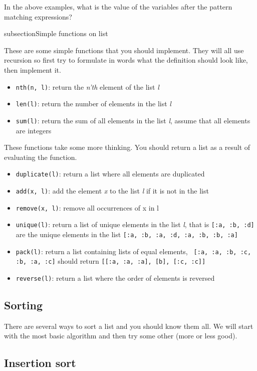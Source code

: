 \documentclass[a4paper,11pt]{article}
\begin{document}
In the above examples, what is the value of the variables after the
pattern matching expressions?

subsection{Simple functions on list}

These are some simple functions that you should implement. They will
all use recursion so first try to formulate in words what the
definition should look like, then implement it.

\begin{itemize}
\item {\tt nth(n, l)}: return the {\em n'th} element of the list {\em l}
\item {\tt len(l)}: return the number of elements in the list  {\em l}
\item {\tt sum(l)}: return the sum of all elements in the list  {\em l}, assume
  that all elements are integers
\end{itemize}

These functions take some more thinking. You should return a list as a
result of evaluating the function.

\begin{itemize}
\item {\tt duplicate(l)}: return a list where all elements are duplicated
\item {\tt add(x, l)}: add the element {\em x} to the list {\em l} if it is not in the list
\item {\tt remove(x, l)}: remove all occurrences of x in l 
\item {\tt unique(l)}: return a list of unique elements in the list {\em l},
  that is {\tt [:a, :b, :d]} are the unique elements in the list {\tt [:a, :b, :a, :d, :a, :b, :b, :a]}
\item {\tt pack(l)}: return a list containing lists of equal elements, {\tt
  [:a, :a, :b, :c, :b, :a, :c]} should return {\tt [[:a, :a, :a], [b], [:c, :c]]}
\item {\tt reverse(l)}: return a list where the order of elements is reversed
\end{itemize}


\subsection{Sorting}

There are several ways to sort a list and you should know them all. We
will start with the most basic algorithm and then try some other (more or less good).


\subsection{Insertion sort}
\end{document}
